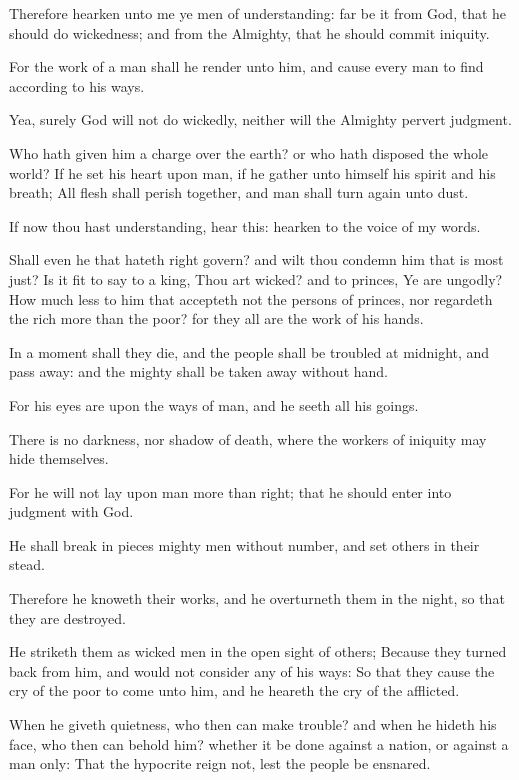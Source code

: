 \verse Therefore hearken unto me ye men of understanding: far be it from God, that he should do wickedness; and from the Almighty, that he should commit iniquity.

\verse For the work of a man shall he render unto him, and cause every man to find according to his ways.

\verse Yea, surely God will not do wickedly, neither will the Almighty pervert judgment.

\verse Who hath given him a charge over the earth? or who hath disposed the whole world?  \verse If he set his heart upon man, if he gather unto himself his spirit and his breath; \verse All flesh shall perish together, and man shall turn again unto dust.

\verse If now thou hast understanding, hear this: hearken to the voice of my words.

\verse Shall even he that hateth right govern? and wilt thou condemn him that is most just?  \verse Is it fit to say to a king, Thou art wicked? and to princes, Ye are ungodly?  \verse How much less to him that accepteth not the persons of princes, nor regardeth the rich more than the poor? for they all are the work of his hands.

\verse In a moment shall they die, and the people shall be troubled at midnight, and pass away: and the mighty shall be taken away without hand.

\verse For his eyes are upon the ways of man, and he seeth all his goings.

\verse There is no darkness, nor shadow of death, where the workers of iniquity may hide themselves.

\verse For he will not lay upon man more than right; that he should enter into judgment with God.

\verse He shall break in pieces mighty men without number, and set others in their stead.

\verse Therefore he knoweth their works, and he overturneth them in the night, so that they are destroyed.

\verse He striketh them as wicked men in the open sight of others; \verse Because they turned back from him, and would not consider any of his ways: \verse So that they cause the cry of the poor to come unto him, and he heareth the cry of the afflicted.

\verse When he giveth quietness, who then can make trouble? and when he hideth his face, who then can behold him? whether it be done against a nation, or against a man only: \verse That the hypocrite reign not, lest the people be ensnared.

